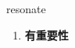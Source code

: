 
\begin{frame}
{\huge resonate}
\begin{center}
\begin{enumerate}\Large
  \item \textbf{有重要性}
\end{enumerate}
\end{center}
\end{frame}
